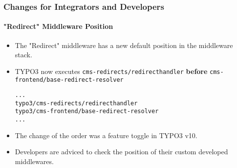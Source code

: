 %

\begin{frame}[fragile]
	\frametitle{Changes for Integrators and Developers}
	\framesubtitle{"Redirect" Middleware Position}

	\lstset{basicstyle=\tiny\ttfamily}

	\begin{itemize}
		\item The "Redirect" middleware has a new default position in the middleware stack.
		\item TYPO3 now executes
			\small\texttt{cms-redirects/redirecthandler}\normalsize\newline
			\textbf{before}
			\texttt{cms-frontend/base-redirect-resolver}\normalsize
\begin{lstlisting}
...
typo3/cms-redirects/redirecthandler
typo3/cms-frontend/base-redirect-resolver
...
\end{lstlisting}

		\item The change of the order was a feature toggle in TYPO3 v10.
		\item Developers are adviced to check the position of their custom developed middlewares.

	\end{itemize}

\end{frame}

